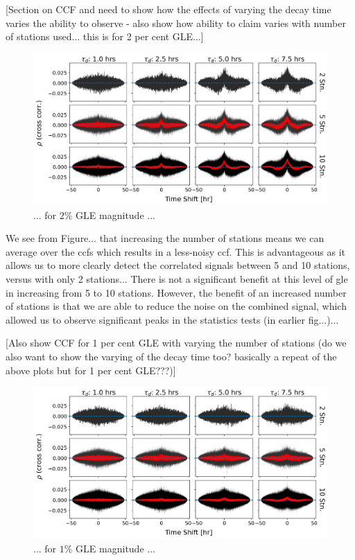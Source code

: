 [Section on CCF and need to show how the effects of varying the decay time varies the ability to observe - also show how ability to claim varies with number of stations used... this is for 2 per cent GLE...]


\begin{figure}[ht!]
	\centering
	\includegraphics[width=\columnwidth]{HS_14008_sims_CCF_2pc_plot.png}
	\caption{... for $2\%$ GLE magnitude ...}
	\label{fig:HS_14008_2pc_sim_CCFs}
\end{figure}




We see from Figure... that increasing the number of stations means we can average over the \glspl{ccf} which results in a less-noisy \gls{ccf}. This is advantageous as it allows us to more clearly detect the correlated signals between 5 and 10 stations, versus with only 2 stations... There is not a significant benefit at this level of \gls{gle} in increasing from 5 to 10 stations. However, the benefit of an increased number of stations is that we are able to reduce the noise on the combined signal, which allowed us to observe significant peaks in the statistics tests (in earlier fig...)...

[Also show CCF for 1 per cent GLE with varying the number of stations (do we also want to show the varying of the decay time too? basically a repeat of the above plots but for 1 per cent GLE???)]

\begin{figure}[ht!]
	\centering
	\includegraphics[width=\columnwidth]{HS_14008_sims_CCF_1pc_plot.png}
	\caption{... for $1\%$ GLE magnitude ...}
	\label{fig:HS_14008_1pc_sim_CCFs}
\end{figure}




